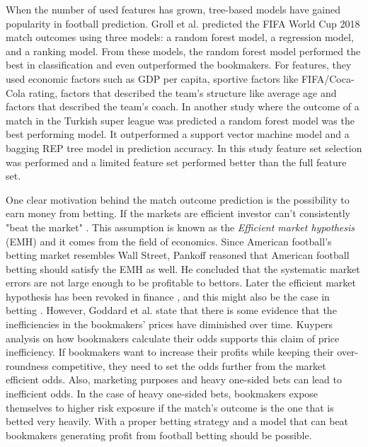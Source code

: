 When the number of used features has grown, tree-based models have gained popularity in football prediction. Groll et al.\cite{groll2018prediction} predicted the FIFA World Cup 2018 match outcomes using three models: a random forest model, a regression model, and a ranking model. From these models, the random forest model performed the best in classification and even outperformed the bookmakers. For features, they used economic factors such as GDP per capita, sportive factors like FIFA/Coca-Cola rating, factors that described the team's structure like average age and factors that described the team's coach. In another study where the outcome of a match in the Turkish super league was predicted a random forest model was the best performing model. It outperformed a support vector machine model and a bagging REP tree model in prediction accuracy. In this study feature set selection was performed and a limited feature set performed better than the full feature set. \cite{10.1007/978-3-319-29504-6_48}

One clear motivation behind the match outcome prediction is the possibility to earn money from betting. If the markets are efficient investor can't consistently "beat the market" \cite{badarinathi1996football}. This assumption is known as the \textit{Efficient market hypothesis} (EMH) and it comes from the field of economics. Since American football's betting market resembles Wall Street, Pankoff \cite{pankoff1968market} reasoned that American football betting should satisfy the EMH as well. He concluded that the systematic market errors are not large enough to be profitable to bettors. Later the efficient market hypothesis has been revoked in finance \cite{jegadeesh1993returns}, and this might also be the case in betting \cite{goddard2003modelling, badarinathi1996football}. However, Goddard et al. \cite{goddard2003modelling} state that there is some evidence that the inefficiencies in the bookmakers’ prices have diminished over time. Kuypers \cite{kuypers2008} analysis on how bookmakers calculate their odds supports this claim of price inefficiency. If bookmakers want to increase their profits while keeping their over-roundness competitive, they need to set the odds further from the market efficient odds. Also, marketing purposes and heavy one-sided bets can lead to inefficient odds. In the case of heavy one-sided bets, bookmakers expose themselves to higher risk exposure if the match's outcome is the one that is betted very heavily. With a proper betting strategy and a model that can beat bookmakers generating profit from football betting should be possible.

